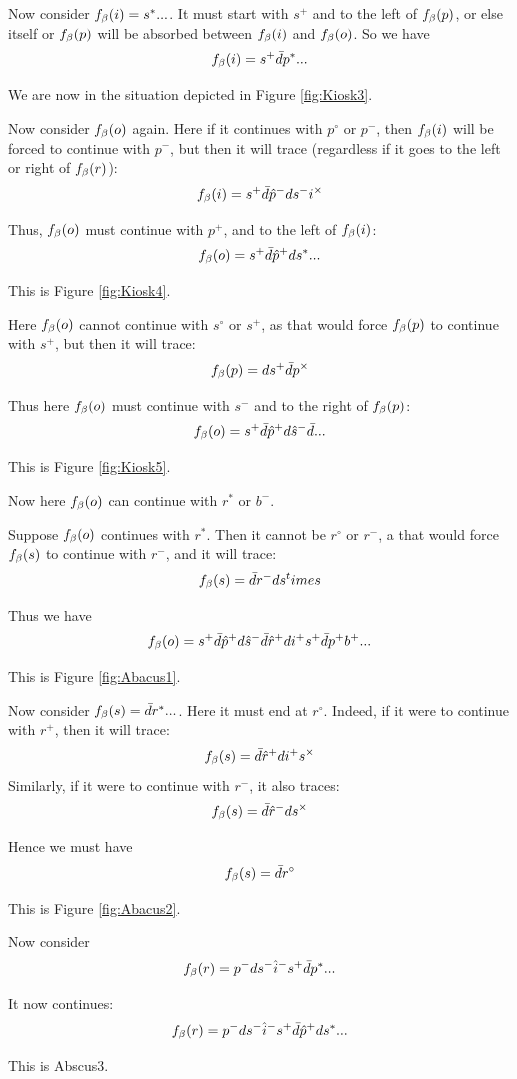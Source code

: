Now consider $f_\beta(i) = s^*...$. It must start with $s^+$ and to the left of $f_\beta(p)$, or else itself or $f_\beta(p)$ will be absorbed between $f_\beta(i)$ and $f_\beta(o)$. So we have
\[
f_\beta(i) = s^+ \bar{d} p^*...
\]

We are now in the situation depicted in Figure \ref{fig:Kiosk3}.

Now consider $f_\beta(o)$ again. Here if it continues with $p^\circ$ or $p^-$, then $f_\beta(i)$ will be forced to continue with $p^-$, but then it will trace (regardless if it goes to the left or right of $f_\beta(r)$):
\[
f_\beta(i) = s^+ \bar{d} \hat{p}^- d s^- i^\times
\]

Thus, $f_\beta(o)$ must continue with $p^+$, and to the left of $f_\beta(i)$:
\[
f_\beta(o) = s^+ \bar{d} \hat{p}^+ d s^*...
\]

This is Figure \ref{fig:Kiosk4}.

Here $f_\beta(o)$ cannot continue with $s^\circ$ or $s^+$, as that would force $f_\beta(p)$ to continue with $s^+$, but then it will trace:
\[
f_\beta(p) = d s^+ \bar{d} p^\times
\]

Thus here $f_\beta(o)$ must continue with $s^-$ and to the right of $f_\beta(p)$:
\[
f_\beta(o) = s^+ \bar{d} \hat{p}^+ d \hat{s}^- \bar{d}...
\]

This is Figure \ref{fig:Kiosk5}.

Now here $f_\beta(o)$ can continue with $r^*$ or $b^-$.

\label{Abacus}
Suppose $f_\beta(o)$ continues with $r^*$. Then it cannot be $r^\circ$ or $r^-$, a that would force $f_\beta(s)$ to continue with $r^-$, and it will trace:
\[
f_\beta(s) = \bar{d} r^- d s^times
\]

Thus we have
\[
f_\beta(o) = s^+ \bar{d} \hat{p}^+ d \hat{s}^- \bar{d} \hat{r}^+ d i^+ s^+ \bar{d} p^+ b^+...
\]

This is Figure \ref{fig:Abacus1}.

Now consider $f_\beta(s) = \bar{d} r^*...$. Here it must end at $r^\circ$. Indeed, if it were to continue with $r^+$, then it will trace:
\[
f_\beta(s) = \bar{d} \hat{r}^+ d i^+ s^\times
\]
Similarly, if it were to continue with $r^-$, it also traces:
\[
f_\beta(s) = \bar{d} \hat{r}^- d s^\times
\]

Hence we must have
\[
f_\beta(s) = \bar{d} r^\circ
\]

This is Figure \ref{fig:Abacus2}.

Now consider 
\[
f_\beta(r) = p^- d s^- \hat{i}^- s^+ \bar{d} p^*...
\]

It now continues:
\[
f_\beta(r) = p^- d s^- \hat{i}^- s^+ \bar{d} \hat{p}^+ d s^*...
\]

This is Abscus3.

